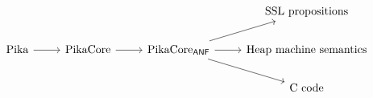 \[\begin{tikzcd}
	&&& {\textnormal{SSL propositions}} \\
	{\textnormal{Pika}} & {\textnormal{PikaCore}} & {\textnormal{PikaCore}_\textsf{ANF}} & {\textnormal{Heap machine semantics}} \\
	&&& {\textnormal{C code}}
	\arrow[from=2-3, to=1-4]
	\arrow[from=2-3, to=2-4]
	\arrow[from=2-3, to=3-4]
	\arrow[from=2-1, to=2-2]
	\arrow[from=2-2, to=2-3]
\end{tikzcd}\]
